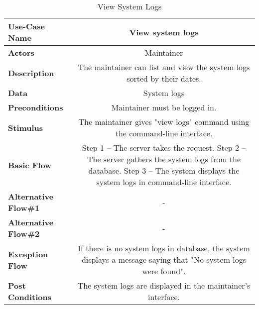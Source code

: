 \begin{table}[H]
     \centering
     \begin{tabular}{|l|C|}
         \hline
          \textbf{Use-Case Name} & View system logs \\
         \hline
          \textbf{Actors} & Maintainer \\ 
         \hline
          \textbf{Description} & The maintainer can list and view the system logs sorted by their dates.\\ 
         \hline
          \textbf{Data} & System logs\\ 
         \hline
          \textbf{Preconditions} & 
          Maintainer must be logged in. \\
         \hline
          \textbf{Stimulus} & The maintainer gives "view logs" command using the command-line interface.\\ 
         \hline
          \textbf{Basic Flow} & 
          Step 1 -- The server takes the request. \newline
          Step 2 -- The server gathers the system logs from the database. \newline
          Step 3 -- The system displays the system logs in command-line interface. \\
         \hline
          \textbf{Alternative Flow\#1} & - \\
         \hline
          \textbf{Alternative Flow\#2} & - \\
         \hline
          \textbf{Exception Flow} & If there is no system logs in database, the system displays a message saying that "No system logs were found". \\
         \hline
          \textbf{Post Conditions} & The system logs are displayed in the maintainer's interface. \\ 
         \hline
     \end{tabular}
     \caption{View System Logs}
     \label{tab:view_system_logs}
 \end{table}